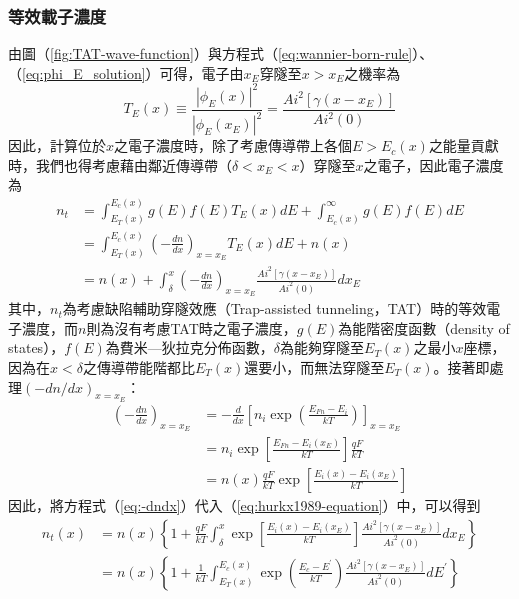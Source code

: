 \subsubsection{等效載子濃度}
由圖（\ref{fig:TAT-wave-function}）與方程式（\ref{eq:wannier-born-rule}）、（\ref{eq:phi_E_solution}）可得，電子由$x_E$穿隧至$x>x_E$之機率為
\begin{equation}
\label{eq:trap-assisted-tunneling-probability}
T_E(x)\equiv\frac{\left\vert\phi_E(x)\right\vert^2}{\left\vert\phi_E(x_E)\right\vert^2}=\frac{Ai^2\left[\gamma(x-x_E)\right]}{Ai^2(0)}
\end{equation}
因此，計算位於$x$之電子濃度時，除了考慮傳導帶上各個$E>E_c(x)$之能量貢獻時，我們也得考慮藉由鄰近傳導帶（$\delta<x_E<x$）穿隧至$x$之電子，因此電子濃度為
\begin{equation}
\label{eq:hurkx1989-equation}
\begin{aligned}
n_t&=\int_{E_T(x)}^{E_c(x)}g(E)f(E)T_E(x)dE+\int_{E_c(x)}^\infty g(E)f(E)dE\\[5pt]
&=\int_{E_T(x)}^{E_c(x)}\left(-\frac{dn}{dx}\right)_{x=x_E}T_E(x)dE+n(x)\\[5pt]
&=n(x)+\int_\delta^x\left(-\frac{dn}{dx}\right)_{x=x_E}\frac{Ai^2\left[\gamma(x-x_E)\right]}{Ai^2(0)}dx_E
\end{aligned}
\end{equation}
其中，$n_t$為考慮缺陷輔助穿隧效應（Trap-assisted tunneling，TAT）時的等效電子濃度，而$n$則為沒有考慮TAT時之電子濃度，$g(E)$為能階密度函數（density of states），$f(E)$為費米—狄拉克分佈函數，$\delta$為能夠穿隧至$E_T(x)$之最小$x$座標，因為在$x<\delta$之傳導帶能階都比$E_T(x)$還要小，而無法穿隧至$E_T(x)$。接著即處理$\left(-dn/dx\right)_{x=x_E}$：
\begin{equation}
\label{eq:-dndx}
\begin{aligned}
\left(-\frac{dn}{dx}\right)_{x=x_E}&=-\frac{d}{dx}\left[n_i\exp\left(\frac{E_{Fn}-E_i}{kT}\right)\right]_{x=x_E}\\[5pt]
&=n_i\exp\left[\frac{E_{Fn}-E_i(x_E)}{kT}\right]\frac{qF}{kT}\\[5pt]
&=n(x)\frac{qF}{kT}\exp\left[\frac{E_i(x)-E_i(x_E)}{kT}\right]
\end{aligned}
\end{equation}
因此，將方程式（\ref{eq:-dndx}）代入（\ref{eq:hurkx1989-equation}）中，可以得到
\begin{equation}
\begin{aligned}
n_t(x)&=n(x)\left\{1+\frac{qF}{kT}\int_\delta^x\exp\left[\frac{E_i(x)-E_i(x_E)}{kT}\right]\frac{Ai^2\left[\gamma(x-x_E)\right]}{Ai^2(0)}dx_E\right\}\\[5pt]
&=n(x)\left\{1+\frac{1}{kT}\int_{E_T(x)}^{E_c(x)}\exp\left(\frac{E_c-E^\prime}{kT}\right)\frac{Ai^2\left[\gamma(x-x_E)\right]}{Ai^2(0)}dE^\prime\right\}
\end{aligned}
\end{equation}
